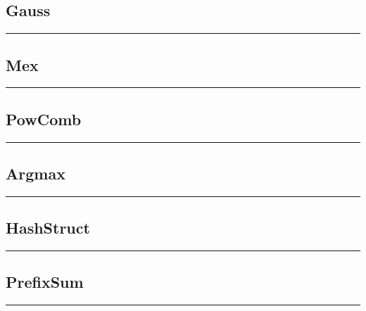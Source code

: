 \documentclass{article}
\begin{document}
\begin{landscape}
\begin{multicols}{2}
\subsection{Gauss}
\vspace{0.2cm}
\hrule

\subsection{Mex}
\vspace{0.2cm}
\hrule

\subsection{PowComb}
\vspace{0.2cm}
\hrule

\subsection{Argmax}
\vspace{0.2cm}
\hrule

\subsection{HashStruct}
\vspace{0.2cm}
\hrule

\subsection{PrefixSum}
\vspace{0.2cm}
\hrule

\end{multicols}
\end{landscape}
\end{document}
